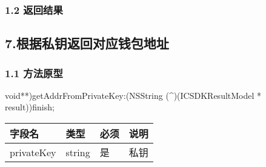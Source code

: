 \documentclass[letterpaper,10pt,english]{sphinxmanual}
\begin{document}
\subsubsection{1.2 返回结果}
\label{\detokenize{BCBWalletSDK_u63a5_u53e3_u8bf4_u660e:id103}}

\begin{sphinxVerbatim}[commandchars=\\\{\}]
     
     
\end{sphinxVerbatim}


\begin{sphinxVerbatim}[commandchars=\\\{\}]
     
\end{sphinxVerbatim}


\subsection{7.根据私钥返回对应钱包地址}
\label{\detokenize{BCBWalletSDK_u63a5_u53e3_u8bf4_u660e:id104}}

\subsubsection{1.1 方法原型}
\label{\detokenize{BCBWalletSDK_u63a5_u53e3_u8bf4_u660e:id105}}
\sphinxstylestrong{-(}void**)getAddrFromPrivateKey:(NSString (\textasciicircum{})(ICSDKResultModel * result))finish;



\begin{savenotes}\sphinxattablestart
\centering
\begin{tabulary}{\linewidth}[t]{|T|T|T|T|}
\hline
\sphinxstyletheadfamily 
字段名
&\sphinxstyletheadfamily 
类型
&\sphinxstyletheadfamily 
必须
&\sphinxstyletheadfamily 
说明
\\
\hline
privateKey
&
string
&
是
&
私钥
\\
\hline
\end{tabulary}
\par
\sphinxattableend\end{savenotes}
\end{document}
